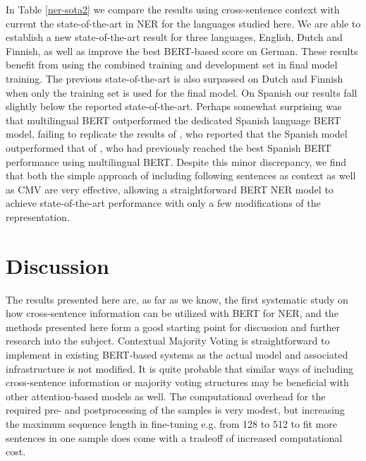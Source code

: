 In Table \ref{ner-sota2} we compare the results using cross-sentence context with current the state-of-the-art in NER for the languages studied here. We are able to establish a new state-of-the-art result for three languages, English, Dutch and Finnish, as well as improve the best BERT-based score on German. These results benefit from using the combined training and development set in final model training. The previous state-of-the-art is also surpassed on Dutch and Finnish when only the training set is used for the final model. On Spanish our results fall slightly below the reported state-of-the-art. Perhaps somewhat surprising was that multilingual BERT outperformed the dedicated Spanish language BERT model, failing to replicate the results of , who reported that the Spanish model outperformed that of , who had previously reached the best Spanish BERT performance using multilingual BERT.
Despite this minor discrepancy, we find that both the simple approach of including following sentences as context as well as CMV are very effective, allowing a straightforward BERT NER model to achieve state-of-the-art performance with only a few modifications of the representation.

\section{Discussion}

The results presented here are, as far as we know, the first systematic study on how cross-sentence information can be utilized with BERT for NER, and the methods presented here form a good starting point for discussion and further research into the subject. Contextual Majority Voting is straightforward to implement in existing BERT-based systems as the actual model and associated infrastructure is not modified. It is quite probable that similar ways of including cross-sentence information or majority voting structures may be beneficial with other attention-based models as well. The computational overhead for the required pre- and postprocessing of the samples is very modest, but increasing the maximum sequence length in fine-tuning e.g. from 128 to 512 to fit more sentences in one sample does come with a tradeoff of increased computational cost.

